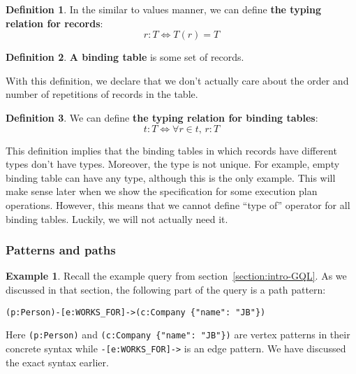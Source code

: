 \documentclass[14pt]{constructor-thesis}
\theoremstyle{definition}
\newtheorem{definition}{Definition}
\newtheorem{example}{Example}
\begin{document}
\begin{definition}
  In the similar to values manner, we can define \textbf{the typing relation for records}:
  $$ r : T \Longleftrightarrow T(r) = T $$
\end{definition}

\begin{definition}
  \textbf{A binding table} is some set of records.
\end{definition}

With this definition, we declare that we don't actually care about the order and number of repetitions of records in the table.

\begin{definition}
  We can define \textbf{the typing relation for binding tables}:
  $$ t : T \Longleftrightarrow \forall r \in t, \, r : T $$
\end{definition}

This definition implies that the binding tables in which records have different types don't have types. Moreover, the type is not unique. For example, empty binding table can have any type, although this is the only example. This will make sense later when we show the specification for some execution plan operations. However, this means that we cannot define ``type of'' operator for all binding tables. Luckily, we will not actually need it.

\subsubsection{Patterns and paths}
\label{sec:GQL-patterns-and-paths}

\begin{example}
  Recall the example query from section~\ref{section:intro-GQL}. As we discussed in that section, the following part of the query is a path pattern:

  \verb+(p:Person)-[e:WORKS_FOR]->(c:Company {"name": "JB"})+

  Here \verb+(p:Person)+ and \verb+(c:Company {"name": "JB"})+ are vertex patterns in their concrete syntax while \verb+-[e:WORKS_FOR]->+ is an edge pattern. We have discussed the exact syntax earlier.

  \label{ex:pattern-parts}
\end{example}

\end{document}
